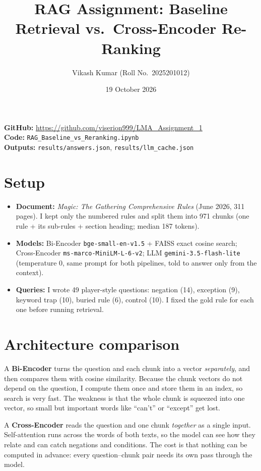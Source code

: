 \documentclass[11pt,a4paper]{article}
\title{RAG Assignment: Baseline Retrieval vs.\ Cross-Encoder Re-Ranking}
\author{Vikash Kumar \quad (Roll No.\ 2025201012)}
\date{19 October 2026}
\newcommand{\code}[1]{\texttt{#1}}
\begin{document}
\sloppy
\vspace*{-1.4cm}
{\let\newpage\relax\maketitle}
\vspace{-0.9cm}

\textbf{GitHub:} \url{https://github.com/viserion999/LMA_Assignment_1}\\
\textbf{Code:} \code{RAG\_Baseline\_vs\_Reranking.ipynb}\\
\textbf{Outputs:} \code{results/answers.json}, \code{results/llm\_cache.json}

\section*{Setup}
\begin{itemize}
  \item \textbf{Document:} \emph{Magic: The Gathering Comprehensive Rules} (June 2026, 311 pages). I kept only the numbered rules and split them into 971 chunks (one rule + its sub-rules + section heading; median 187 tokens).
  \item \textbf{Models:} Bi-Encoder \code{bge-small-en-v1.5} + FAISS exact cosine search; Cross-Encoder \code{ms-marco-MiniLM-L-6-v2}; LLM \code{gemini-3.5-flash-lite} (temperature 0, same prompt for both pipelines, told to answer only from the context).
  \item \textbf{Queries:} I wrote 49 player-style questions: negation (14), exception (9), keyword trap (10), buried rule (6), control (10). I fixed the gold rule for each one before running retrieval.
\end{itemize}

\section{Architecture comparison}
A \textbf{Bi-Encoder} turns the question and each chunk into a vector \emph{separately}, and then compares them with cosine similarity. Because the chunk vectors do not depend on the question, I compute them once and store them in an index, so search is very fast. The weakness is that the whole chunk is squeezed into one vector, so small but important words like ``can't'' or ``except'' get lost.

A \textbf{Cross-Encoder} reads the question and one chunk \emph{together} as a single input. Self-attention runs across the words of both texts, so the model can see how they relate and can catch negations and conditions. The cost is that nothing can be computed in advance: every question--chunk pair needs its own pass through the model.
\end{document}
